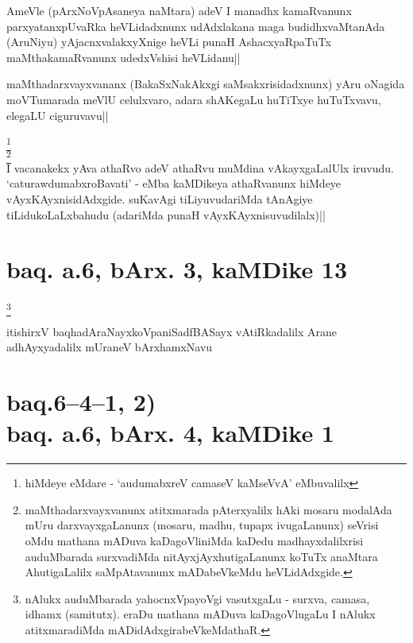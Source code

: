 \begin{artha}
AmeVle (pArxNoVpAsaneya naMtara) adeV I manadhx kamaRvanunx 
parxyatanxpUvaRka heVLidadxnunx udAdxlakana maga budidhxvaMtanAda 
(AruNiyu) yAjacnxvalakxyXnige heVLi punaH AshacxyaRpaTuTx 
maMthakamaRvanunx udedxVshisi heVLidanu||
\end{artha}


\begin{artha}
maMthadarxvayxvananx (BakaSxNakAkxgi saMsakxrisidadxnunx) yAru oNagida 
moVTumarada meVlU celulxvaro, adara shAKegaLu huTiTxye huTuTxvavu, 
elegaLU ciguruvavu||
\end{artha}

\begin{artha}
\footnote[1]{hiMdeye eMdare - `audumabxreV camaseV kaMseVvA' eMbuvalilx}\\
\footnote[2]{maMthadarxvayxvanunx atitxmarada pAterxyalilx hAki mosaru 
modalAda mUru darxvayxgaLanunx (mosaru, madhu, tupapx ivugaLanunx) 
seVrisi oMdu mathana mADuva kaDagoVliniMda kaDedu madhayxdalilxrisi 
auduMbarada surxvadiMda nitAyxjAyxhutigaLanunx koTuTx anaMtara 
AhutigaLalilx saMpAtavanunx mADabeVkeMdu heVLidAdxgide.}\\
I vacanakekx yAva athaRvo adeV athaRvu muMdina vAkayxgaLalUlx iruvudu. 
`caturawdumabxroBavati' - eMba kaMDikeya athaRvanunx hiMdeye 
vAyxKAyxnisidAdxgide. suKavAgi tiLiyuvudariMda tAnAgiye 
tiLidukoLaLxbahudu (adariMda punaH vAyxKAyxnisuvudilalx)||
\end{artha}

\section*{baq. a.6, bArx. 3, kaMDike 13}

\footnote[3]{nAlukx auduMbarada yahocnxVpayoVgi vasutxgaLu - surxva, 
camasa, idhamx (samitutx). eraDu mathana mADuva kaDagoVlugaLu I nAlukx 
atitxmaradiMda mADidAdxgirabeVkeMdathaR.}\stext

\begin{center}
itishirxV baqhadAraNayxkoVpaniSadfBASayx vAtiRkadalilx Arane 
adhAyxyadalilx mUraneV bArxhamxNavu
\end{center}

\section*{baq.6--4--1, 2)\\ baq. a.6, bArx. 4, kaMDike 1}

